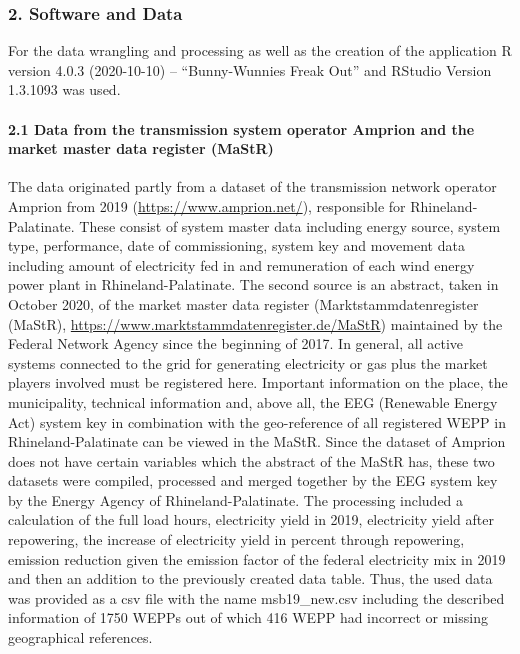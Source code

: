 \documentclass[
]{article}
\begin{document}
\hypertarget{software-and-data}{%
\subsubsection{2. Software and Data}\label{software-and-data}}

For the data wrangling and processing as well as the creation of the
application R version 4.0.3 (2020-10-10) -- ``Bunny-Wunnies Freak Out''
and RStudio Version 1.3.1093 was used.

\hypertarget{data-from-the-transmission-system-operator-amprion-and-the-market-master-data-register-mastr}{%
\paragraph{2.1 Data from the transmission system operator Amprion and
the market master data register
(MaStR)}\label{data-from-the-transmission-system-operator-amprion-and-the-market-master-data-register-mastr}}

The data originated partly from a dataset of the transmission network
operator Amprion from 2019 (\url{https://www.amprion.net/}), responsible
for Rhineland-Palatinate. These consist of system master data including
energy source, system type, performance, date of commissioning, system
key and movement data including amount of electricity fed in and
remuneration of each wind energy power plant in Rhineland-Palatinate.
The second source is an abstract, taken in October 2020, of the market
master data register (Marktstammdatenregister (MaStR),
\url{https://www.marktstammdatenregister.de/MaStR}) maintained by the
Federal Network Agency since the beginning of 2017. In general, all
active systems connected to the grid for generating electricity or gas
plus the market players involved must be registered here. Important
information on the place, the municipality, technical information and,
above all, the EEG (Renewable Energy Act) system key in combination with
the geo-reference of all registered WEPP in Rhineland-Palatinate can be
viewed in the MaStR. Since the dataset of Amprion does not have certain
variables which the abstract of the MaStR has, these two datasets were
compiled, processed and merged together by the EEG system key by the
Energy Agency of Rhineland-Palatinate. The processing included a
calculation of the full load hours, electricity yield in 2019,
electricity yield after repowering, the increase of electricity yield in
percent through repowering, emission reduction given the emission factor
of the federal electricity mix in 2019 and then an addition to the
previously created data table. Thus, the used data was provided as a csv
file with the name msb19\_new.csv including the described information of
1750 WEPPs out of which 416 WEPP had incorrect or missing geographical
references.
\end{document}
